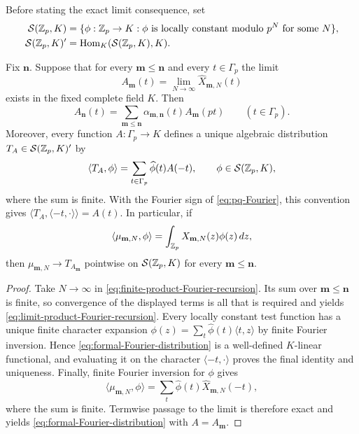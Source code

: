 Before stating the exact limit consequence, set
\begin{align*}
 \mathcal S(\mathbb Z_p,K)
 &=\{\phi:\mathbb Z_p\to K:\phi\text{ is locally constant modulo }p^N
       \text{ for some }N\},\\
 \mathcal S(\mathbb Z_p,K)'
 &=\operatorname{Hom}_K(\mathcal S(\mathbb Z_p,K),K).
\end{align*}

\begin{proposition}
\label{prop:finite-transform-limit}
Fix $\mathbf n$.  Suppose that for every $\mathbf m\leq\mathbf n$ and every
$t\in\Gamma_p$ the limit
\[
 A_{\mathbf m}(t)=\lim_{N\to\infty}
 \widehat X_{\mathbf m,N}(t)
\]
exists in the fixed complete field $K$.  Then
\begin{equation}
\label{eq:limit-product-Fourier-recursion}
 A_{\mathbf n}(t)=
 \sum_{\mathbf m\leq\mathbf n}
 \alpha_{\mathbf m,\mathbf n}(t)A_{\mathbf m}(pt)
 \qquad(t\in\Gamma_p).
\end{equation}
Moreover, every function $A:\Gamma_p\to K$ defines a unique algebraic
distribution $T_A\in\mathcal S(\mathbb Z_p,K)'$ by
\begin{equation}
\label{eq:formal-Fourier-distribution}
 \langle T_A,\phi\rangle
 =\sum_{t\in\Gamma_p}\widehat\phi(t)A(-t),
 \qquad \phi\in\mathcal S(\mathbb Z_p,K),
\end{equation}
where the sum is finite.  With the Fourier sign of
\cref{eq:pq-Fourier}, this convention gives
$\langle T_A,\langle-t,\cdot\rangle\rangle=A(t)$.  In particular, if
\[
 \langle\mu_{\mathbf m,N},\phi\rangle
 =\int_{\mathbb Z_p}X_{\mathbf m,N}(z)\phi(z)\,dz,
\]
then $\mu_{\mathbf m,N}\to T_{A_{\mathbf m}}$ pointwise on
$\mathcal S(\mathbb Z_p,K)$ for every $\mathbf m\leq\mathbf n$.
\end{proposition}

\begin{proof}
Take $N\to\infty$ in
\cref{eq:finite-product-Fourier-recursion}.  Its sum over
$\mathbf m\leq\mathbf n$ is finite, so convergence of the displayed terms is
all that is required and yields
\cref{eq:limit-product-Fourier-recursion}.  Every locally constant test
function has a unique finite character expansion
$\phi(z)=\sum_t\widehat\phi(t)\langle t,z\rangle$ by finite Fourier
inversion.  Hence \cref{eq:formal-Fourier-distribution} is a well-defined
$K$-linear functional, and evaluating it on the character
$\langle-t,\cdot\rangle$ proves the final identity and uniqueness.  Finally,
finite Fourier inversion for $\phi$ gives
\[
 \langle\mu_{\mathbf m,N},\phi\rangle
 =\sum_t\widehat\phi(t)\widehat X_{\mathbf m,N}(-t),
\]
where the sum is finite.  Termwise passage to the limit is therefore exact
and yields \cref{eq:formal-Fourier-distribution} with
$A=A_{\mathbf m}$.
\end{proof}

